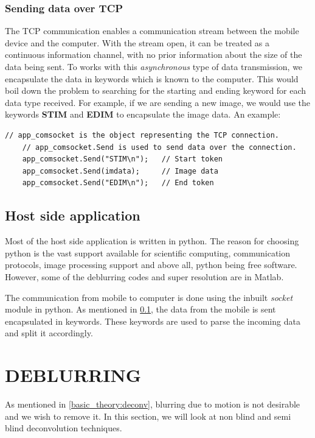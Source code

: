 \documentclass[BTech]{iitmdiss}
\begin{document}
\subsection{Sending data over TCP}
\label{device:device_app:tcp}
The TCP communication enables a communication stream between the mobile
device and the computer. With the stream open, it can be treated as a 
continuous information channel, with no prior information about the size
of the data being sent. To works with this \emph{asynchronous} type of
data transmission, we encapsulate the data in keywords which is known to
the computer. This would boil down the problem to searching for the 
starting and ending keyword for each data type received. For example, if
we are sending a new image, we would use the keywords \textbf{STIM} and
\textbf{EDIM} to encapsulate the image data. An example: 

\begin{singlespacing}
\begin{lstlisting}[style=sharpclisting]
    // app_comsocket is the object representing the TCP connection.
    // app_comsocket.Send is used to send data over the connection.
    app_comsocket.Send("STIM\n");   // Start token
    app_comsocket.Send(imdata);     // Image data
    app_comsocket.Send("EDIM\n");   // End token
\end{lstlisting}
\end{singlespacing}

\section{Host side application}
\label{device:host}
Most of the host side application is written in python. The reason for 
choosing python is the vast support available for scientific computing,
communication protocols, image processing support and above all, python
being free software. However, some of the deblurring codes and 
super resolution are in Matlab.

The communication from mobile to computer is done using the inbuilt
\emph{socket} module in python. As mentioned in 
\ref{device:device_app:tcp}, the data from the mobile is sent
encapsulated in keywords. These keywords are used to parse the incoming
data and split it accordingly. 

\pagebreak

\chapter{DEBLURRING}
\label{chap:deblurring}
As mentioned in \ref*{basic_theory:deconv}, blurring due to motion is
not desirable and we wish to remove it. In this section, we will look at
non blind and semi blind deconvolution techniques. 
\end{document}
